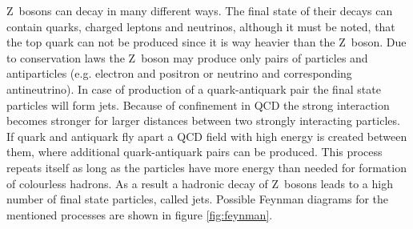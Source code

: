 \documentclass[11pt, a4paper]{article}
\numberwithin{equation}{section}
\begin{document}
Z~bosons can decay in many different ways.
The final state of their decays can contain quarks, charged leptons and neutrinos, although it must be noted, that the top quark can not be produced since it is way heavier than the Z~boson.
Due to conservation laws the Z~boson may produce only pairs of particles and antiparticles (e.g. electron and positron or neutrino and corresponding antineutrino).
In case of production of a quark-antiquark pair the final state particles will form jets.
Because of confinement in QCD the strong interaction becomes stronger for larger distances between two strongly interacting particles.
If quark and antiquark fly apart a QCD field with high energy is created between them, where additional quark-antiquark pairs can be produced.
This process repeats itself as long as the particles have more energy than needed for formation of colourless hadrons.
As a result a hadronic decay of Z~bosons leads to a high number of final state particles, called jets.
Possible Feynman diagrams for the mentioned processes are shown in figure \ref{fig:feynman}.
\end{document}
